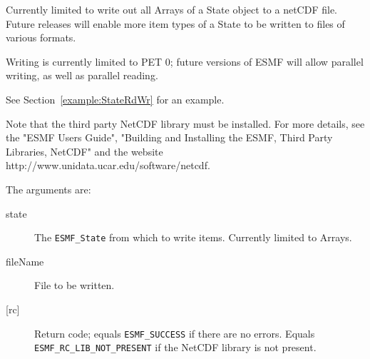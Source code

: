        Currently limited to write out all Arrays of a State object to a
       netCDF file.  Future releases will enable more item types of a State to
       be written to files of various formats.
  
       Writing is currently limited to PET 0; future versions of ESMF will allow
       parallel writing, as well as parallel reading.
  
       See Section~\ref{example:StateRdWr} for an example.
  
       Note that the third party NetCDF library must be installed.  For more
       details, see the "ESMF Users Guide",
       "Building and Installing the ESMF, Third Party Libraries, NetCDF" and
       the website http://www.unidata.ucar.edu/software/netcdf.
  
       The arguments are:
       \begin{description}
       \item[state]
         The {\tt ESMF\_State} from which to write items.  Currently limited to
         Arrays.
       \item[fileName]
         File to be written.  
       \item[{[rc]}]
         Return code; equals {\tt ESMF\_SUCCESS} if there are no errors.
         Equals {\tt ESMF\_RC\_LIB\_NOT\_PRESENT} if the NetCDF library is
         not present.
       \end{description}
  
\setlength{\parskip}{\oldparskip}
\setlength{\parindent}{\oldparindent}
\setlength{\baselineskip}{\oldbaselineskip}
